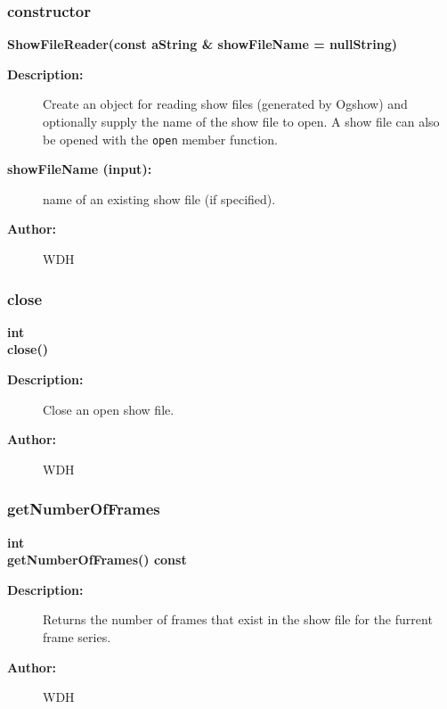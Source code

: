 \subsubsection{constructor}
 
\newlength{\ShowFileReaderIncludeArgIndent}
\begin{flushleft} \textbf{%
\settowidth{\ShowFileReaderIncludeArgIndent}{ShowFileReader(}%
ShowFileReader(const aString \& showFileName  = nullString)
}\end{flushleft}
\begin{description}
\item[{\bf Description:}] 
    Create an object for reading show files (generated by Ogshow) and
  optionally supply the name of the show file to open. A show file can
  also be opened with the {\tt open} member function.
\item[{\bf showFileName (input):}]  name of an existing show file (if specified).
\item[{\bf Author:}]  WDH
\end{description}
\subsubsection{close}
 
\begin{flushleft} \textbf{%
int  \\ 
\settowidth{\ShowFileReaderIncludeArgIndent}{close(}%
close()
}\end{flushleft}
\begin{description}
\item[{\bf Description:}] 
    Close an open show file.
\item[{\bf Author:}]  WDH
\end{description}
\subsubsection{getNumberOfFrames}
 
\begin{flushleft} \textbf{%
int  \\ 
\settowidth{\ShowFileReaderIncludeArgIndent}{getNumberOfFrames(}%
getNumberOfFrames() const
}\end{flushleft}
\begin{description}
\item[{\bf Description:}] 
    Returns the number of frames that exist in the show file for the furrent frame series. 
\item[{\bf Author:}]  WDH
\end{description}
